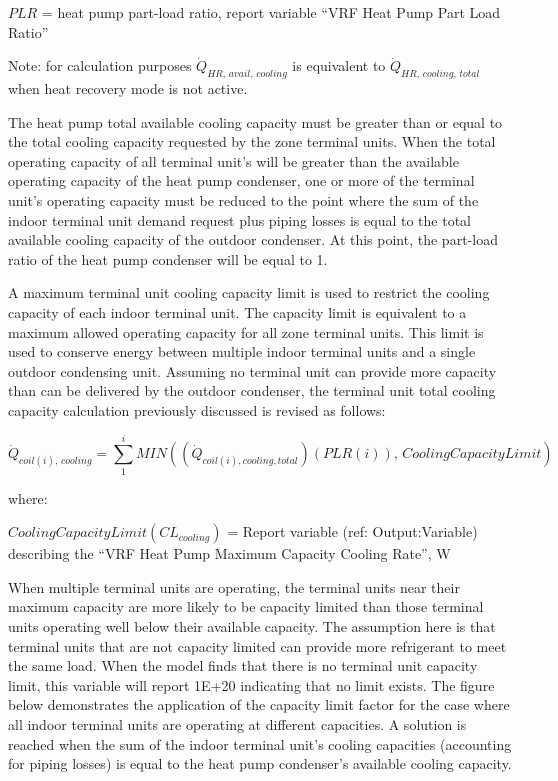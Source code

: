 \(PLR\) = heat pump part-load ratio, report variable ``VRF Heat Pump Part Load Ratio''

Note: for calculation purposes \(\dot{Q}_{HR,\,avail,\,cooling}\) is equivalent to \(\dot{Q}_{HR,\,cooling,\,total}\) when heat recovery mode is not active.

The heat pump total available cooling capacity must be greater than or equal to the total cooling capacity requested by the zone terminal units. When the total operating capacity of all terminal unit's will be greater than the available operating capacity of the heat pump condenser, one or more of the terminal unit's operating capacity must be reduced to the point where the sum of the indoor terminal unit demand request plus piping losses is equal to the total available cooling capacity of the outdoor condenser. At this point, the part-load ratio of the heat pump condenser will be equal to 1.

A maximum terminal unit cooling capacity limit is used to restrict the cooling capacity of each indoor terminal unit. The capacity limit is equivalent to a maximum allowed operating capacity for all zone terminal units. This limit is used to conserve energy between multiple indoor terminal units and a single outdoor condensing unit. Assuming no terminal unit can provide more capacity than can be delivered by the outdoor condenser, the terminal unit total cooling capacity calculation previously discussed is revised as follows:

\begin{equation}
  \dot{Q}_{coil(i),\,cooling} = \sum\limits_1^i MIN \left( \left( \dot{Q}_{coil(i),cooling,total} \right) \left( PLR(i) \right),\,CoolingCapacityLimit \right)
\end{equation}

where:

\(CoolingCapacityLimit(CL_{cooling})\) = Report variable (ref: Output:Variable) describing the ``VRF Heat Pump Maximum Capacity Cooling Rate'', W

When multiple terminal units are operating, the terminal units near their maximum capacity are more likely to be capacity limited than those terminal units operating well below their available capacity. The assumption here is that terminal units that are not capacity limited can provide more refrigerant to meet the same load. When the model finds that there is no terminal unit capacity limit, this variable will report 1E+20 indicating that no limit exists.  The figure below demonstrates the application of the capacity limit factor for the case where all indoor terminal units are operating at different capacities. A solution is reached when the sum of the indoor terminal unit's cooling capacities (accounting for piping losses) is equal to the heat pump condenser's available cooling capacity.

